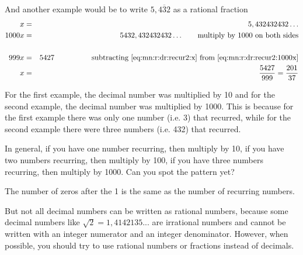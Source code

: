 \documentclass[10pt,a4paper,titlepage,twoside,openright]{report}
\begin{document}
And another example would be to write $5,\overline{432}$ as a rational fraction
\begin{eqnarray}
\label{eq:mn:r:dr:recur2:x}
x &=& 5,432432432 \ldots \\
\label{eq:mn:r:dr:recur2:1000x}
1000x &=& 5432,432432432 \ldots \qquad \text{multiply by 1000 on both sides} \\ \nonumber
\\ \nonumber
999x &=& 5427\quad\qquad\qquad
\text{subtracting \eqref{eq:mn:r:dr:recur2:x}
from \eqref{eq:mn:r:dr:recur2:1000x}}\\ \nonumber
x &=& \frac{5427}{999} = \frac{201}{37}
\end{eqnarray}

For the first example, the decimal number was multiplied by 10 and for the second example, the decimal number was multiplied by 1000. This is because for the first example there was only one number (i.e. 3) that recurred, while for the second example there were three numbers (i.e. 432) that recurred.

In general, if you have one number recurring, then multiply by 10, if you have two numbers recurring, then multiply by 100, if you have three numbers recurring, then multiply by 1000. Can you spot the pattern yet?

The number of zeros after the 1 is the same as the number of recurring numbers.

But not all decimal numbers can be written as rational numbers, because some decimal numbers like $\sqrt{2}=1,4142135...$ are irrational numbers and cannot be written with an integer numerator and an integer denominator. However, when possible, you should try to use rational numbers or fractions instead of decimals.

\end{document}
